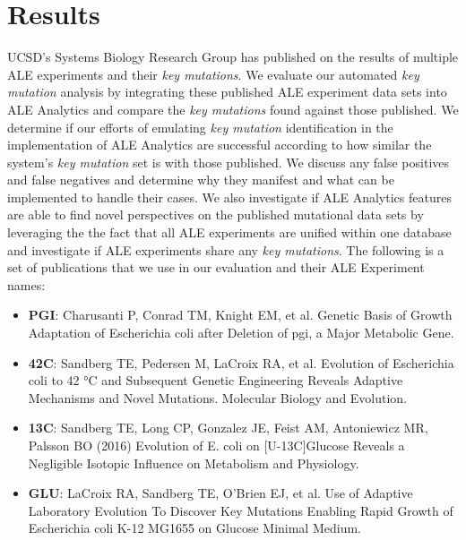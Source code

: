 \documentclass[12pt,final,masters,chapterheads]{ucsd}  %
\begin{document}
\section{Results}

%
%
UCSD's Systems Biology Research Group has published on the results of multiple ALE experiments and their \textit{key mutations}. We evaluate our automated \textit{key mutation} analysis by integrating these published ALE experiment data sets into ALE Analytics and compare the \textit{key mutations} found against those published.  We determine if our efforts of emulating \textit{key mutation} identification in the implementation of ALE Analytics are successful according to how similar the system's \textit{key mutation} set is with those published. We discuss any false positives and false negatives and determine why they manifest and what can be implemented to handle their cases. We also investigate if ALE Analytics features are able to find novel perspectives on the published mutational data sets by leveraging the the fact that all ALE experiments are unified within one database and investigate if ALE experiments share any \textit{key mutations}. The following is a set of publications that we use in our evaluation and their ALE Experiment names:
\begin{itemize}
\item \textbf{PGI}: Charusanti P, Conrad TM, Knight EM, et al. Genetic Basis of Growth Adaptation of Escherichia coli after Deletion of pgi, a Major Metabolic Gene. \cite{10.1371/journal.pgen.1001186}
\item \textbf{42C}: Sandberg TE, Pedersen M, LaCroix RA, et al. Evolution of Escherichia coli to 42 °C and Subsequent Genetic Engineering Reveals Adaptive Mechanisms and Novel Mutations. Molecular Biology and Evolution. \cite{pmid25015645}
\item \textbf{13C}: Sandberg TE, Long CP, Gonzalez JE, Feist AM, Antoniewicz MR, Palsson BO (2016) Evolution of E. coli on [U-13C]Glucose Reveals a Negligible Isotopic Influence on Metabolism and Physiology. \cite{pmid26964043}
\item \textbf{GLU}: LaCroix RA, Sandberg TE, O'Brien EJ, et al. Use of Adaptive Laboratory Evolution To Discover Key Mutations Enabling Rapid Growth of Escherichia coli K-12 MG1655 on Glucose Minimal Medium. \cite{pmid25304508}
\end{itemize}
\end{document}
